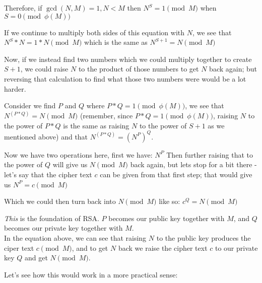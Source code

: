 Therefore, if $\gcd(N,M) = 1, N < M$ then $N^S = 1 \pmod{M}$ when $S = 0 \pmod{\phi(M)}$

If we continue to multiply both sides of this equation with $N$, we see that $N^S * N = 1 * N \pmod{M}$ which is the same as $N^{S+1} = N \pmod{M}$

Now, if we instead find two numbers which we could multiply together to create $S+1$, we could raise $N$ to the product of those numbers to get $N$ back again; but reversing that calculation to find what those two numbers were would be a lot harder.

Consider we find $P$ and $Q$ where $P*Q = 1 \pmod{\phi(M)}$, we see that $N^{(P*Q)} = N \pmod{M}$ (remember, since $P*Q = 1 \pmod{\phi(M)}$, raising $N$ to the power of $P*Q$ is the same as raising $N$ to the power of $S+1$ as we mentioned above) and that $N^{(P*Q)} = (N^P)^Q$.

Now we have two operations here, first we have:
$N^P$
Then further raising that to the power of $Q$ will give us $N \pmod{M}$ back again, but lets stop for a bit there - let's say that the cipher text $c$ can be given from that first step; that would give us
$N^P = c \pmod{M}$

Which we could then turn back into $N \pmod{M}$ like so:
$c^Q = N \pmod{M}$

\textit{This} is the foundation of RSA. $P$ becomes our public key together with $M$, and $Q$ becomes our private key together with $M$.\\

In the equation above, we can see that raising $N$ to the public key produces the ciper text $c \pmod{M}$, and to get $N$ back we raise the cipher text $c$ to our private key $Q$ and get $N \pmod{M}$.

Let's see how this would work in a more practical sense: \\

